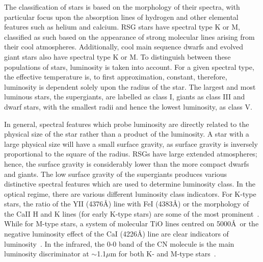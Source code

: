 The classification of stars is based on the morphology of their spectra, with particular focus upon the absorption lines of hydrogen and other elemental features such as helium and calcium.
RSG stars have spectral type K or M, classified as such based on the appearance of strong molecular lines arising from their cool atmospheres.
Additionally, cool main sequence dwarfs and evolved giant stars also have spectral type K or M.
To distinguish between these populations of stars, luminosity is taken into account.
For a given spectral type, the effective temperature is, to first approximation, constant, therefore, luminosity is dependent solely upon the radius of the star.
The largest and most luminous stars, the supergiants, are labelled as class I, giants as class III and dwarf stars, with the smallest radii and hence the lowest luminosity, as class V.


In general, spectral features which probe luminosity are directly related to the physical size of the star rather than a product of the luminosity.
A star with a large physical size will have a small surface gravity, as surface gravity is inversely proportional to the square of the radius.
RSGs have large extended atmospheres; hence, the surface gravity is considerably lower than the more compact dwarfs and giants.
The low surface gravity of the supergiants produces various distinctive spectral features which are used to determine luminosity class.
In the optical regime, there are various different luminosity class indicators.
For K-type stars, the ratio of the YII (4376\AA) line with FeI (4383\AA) or the morphology of the CaII H and K lines (for early K-type stars) are some of the most prominent~\citep{b:GrayCorbally}.
While for M-type stars, a system of molecular TiO lines centred on 5000\AA ~or the negative luminosity effect of the CaI (4226\AA) line are clear indicators of luminosity~\citep{b:GrayCorbally}.
In the infrared, the 0-0 band of the CN molecule is the main luminosity discriminator at $\sim$1.1$\mu$m for both K- and M-type stars~\citep{b:GrayCorbally}.




